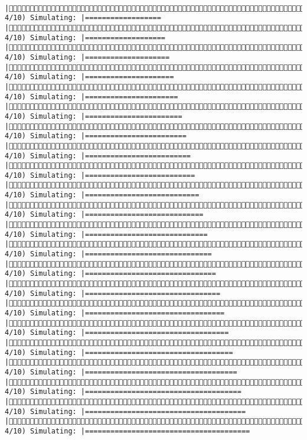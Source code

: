 \documentclass[]{article}
\begin{document}
\begin{verbatim}
             |( 4/10) Simulating: |==================                                   |( 4/10) Simulating: |===================                                  |( 4/10) Simulating: |====================                                 |( 4/10) Simulating: |=====================                                |( 4/10) Simulating: |======================                               |( 4/10) Simulating: |=======================                              |( 4/10) Simulating: |========================                             |( 4/10) Simulating: |=========================                            |( 4/10) Simulating: |==========================                           |( 4/10) Simulating: |===========================                          |( 4/10) Simulating: |============================                         |( 4/10) Simulating: |=============================                        |( 4/10) Simulating: |==============================                       |( 4/10) Simulating: |===============================                      |( 4/10) Simulating: |================================                     |( 4/10) Simulating: |=================================                    |( 4/10) Simulating: |==================================                   |( 4/10) Simulating: |===================================                  |( 4/10) Simulating: |====================================                 |( 4/10) Simulating: |=====================================                |( 4/10) Simulating: |======================================               |( 4/10) Simulating: |=======================================              
\end{verbatim}
\end{document}
